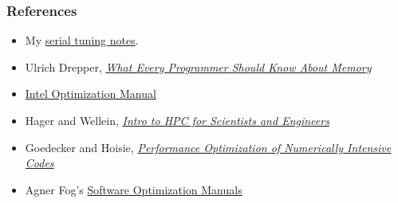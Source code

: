 \documentclass{beamer}
\begin{document}
\begin{frame}
  \frametitle{References}

  \begin{itemize}
  \item My
    \href{http://www.cs.cornell.edu/~bindel/class/cs5220-f11/notes/serial-tuning.pdf}{serial
      tuning notes}.
  \item Ulrich Drepper,
    \href{http://people.redhat.com/drepper/cpumemory.pdf}{\em What
      Every Programmer Should Know About Memory}
  \item \href{http://www.intel.com/Assets/PDF/manual/248966.pdf}{Intel
    Optimization Manual}
  \item Hager and Wellein,
    \href{https://www.crcpress.com/Introduction-to-High-Performance-Computing-for-Scientists-and-Engineers/Hager-Wellein/p/book/9781439811924}{\em
      Intro
      to HPC for Scientists and Engineers}
  \item Goedecker and Hoisie, \href{http://epubs.siam.org/doi/book/10.1137/1.9780898718218}{\em Performance Optimization of
    Numerically Intensive Codes}
  \item Agner Fog's \href{http://www.agner.org/optimize/}{Software
    Optimization Manuals}
  \end{itemize}
\end{frame}
\end{document}
